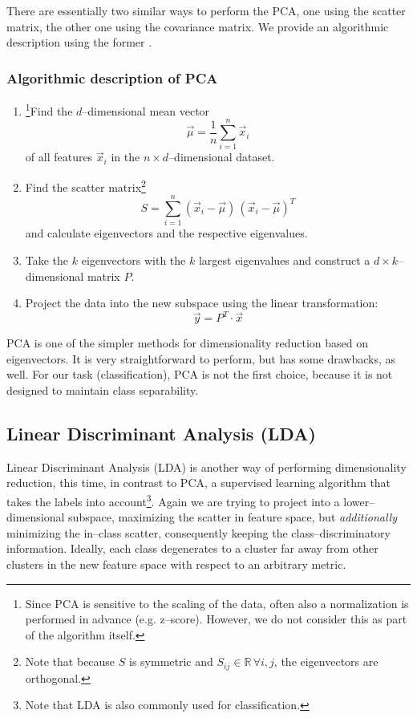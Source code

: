There are essentially two similar ways to perform the PCA, one using the scatter matrix, the other one using the covariance matrix. We provide an algorithmic description using the former \citep{duda2001}.

\subsubsection{Algorithmic description of PCA}
\label{par:pca-algorithm}
\begin{enumerate}
\item \footnote{Since PCA is sensitive to the scaling of the data, often also a normalization is performed in advance (e.g. z--score). However, we do not consider this as part of the algorithm itself.}Find the $d$--dimensional mean vector
\begin{equation}
\label{eq:mean-vector}
\vec \mu = \frac{1}{n} \sum_{i = 1}^n \vec x_i
\end{equation}
of all features $\vec x_i$ in the $n \times d$--dimensional dataset.
\item Find the scatter matrix\footnote{Note that because $S$ is symmetric and $S_{ij} \in \mathbb{R} \, \forall i,j$, the eigenvectors are orthogonal.}
\begin{equation}
S = \sum_{i=1}^n (\vec x_i - \vec \mu) \, (\vec x_i - \vec \mu)^T
\end{equation}
and calculate eigenvectors and the respective eigenvalues.
\item Take the $k$ eigenvectors with the $k$ largest eigenvalues and construct a $d \times k$--dimensional matrix $P$.
\item Project the data into the new subspace using the linear transformation:
\begin{equation}
\vec y = P^T \cdot \vec x
\end{equation}
\end{enumerate}

PCA is one of the simpler methods for dimensionality reduction based on eigenvectors. It is very straightforward to perform, but has some drawbacks, as well. For our task (classification), PCA is not the first choice, because it is not designed to maintain class separability.

\subsection{Linear Discriminant Analysis (LDA)}
\label{sec:theory:lda}

Linear Discriminant Analysis (LDA) is another way of performing dimensionality reduction, this time, in contrast to PCA, a supervised learning algorithm that takes the labels into account\footnote{Note that LDA is also commonly used for classification.}. Again we are trying to project into a lower--dimensional subspace, maximizing the scatter in feature space, but \emph{additionally} minimizing the in--class scatter, consequently keeping the class--discriminatory information. Ideally, each class degenerates to a cluster far away from other clusters in the new feature space with respect to an arbitrary metric.

